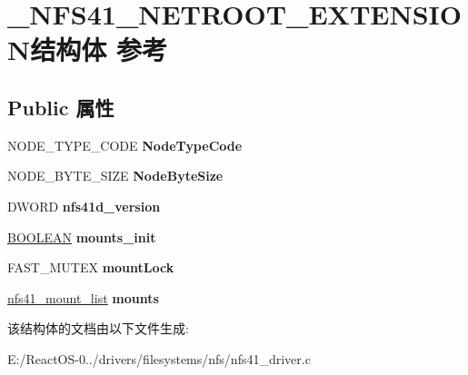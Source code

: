 \hypertarget{struct___n_f_s41___n_e_t_r_o_o_t___e_x_t_e_n_s_i_o_n}{}\section{\+\_\+\+N\+F\+S41\+\_\+\+N\+E\+T\+R\+O\+O\+T\+\_\+\+E\+X\+T\+E\+N\+S\+I\+O\+N结构体 参考}
\label{struct___n_f_s41___n_e_t_r_o_o_t___e_x_t_e_n_s_i_o_n}
\subsection*{Public 属性}
\begin{DoxyCompactItemize}
\item 
\mbox{\label{struct___n_f_s41___n_e_t_r_o_o_t___e_x_t_e_n_s_i_o_n_aedc8602747b987dd77724fafc4ced9c5}} 
N\+O\+D\+E\+\_\+\+T\+Y\+P\+E\+\_\+\+C\+O\+DE {\bfseries Node\+Type\+Code}
\item 
\mbox{\label{struct___n_f_s41___n_e_t_r_o_o_t___e_x_t_e_n_s_i_o_n_a5f8a9306eee11015306720f79f407eb6}} 
N\+O\+D\+E\+\_\+\+B\+Y\+T\+E\+\_\+\+S\+I\+ZE {\bfseries Node\+Byte\+Size}
\item 
\mbox{\label{struct___n_f_s41___n_e_t_r_o_o_t___e_x_t_e_n_s_i_o_n_a34e9e3fd32e45bdb32dd121f71abb9e8}} 
D\+W\+O\+RD {\bfseries nfs41d\+\_\+version}
\item 
\mbox{\label{struct___n_f_s41___n_e_t_r_o_o_t___e_x_t_e_n_s_i_o_n_af01ff4e721acf2ea9d7417a7e3f3e5dd}} 
\hyperlink{_processor_bind_8h_a112e3146cb38b6ee95e64d85842e380a}{B\+O\+O\+L\+E\+AN} {\bfseries mounts\+\_\+init}
\item 
\mbox{\label{struct___n_f_s41___n_e_t_r_o_o_t___e_x_t_e_n_s_i_o_n_acf5b5c4618de537cd813a78de6811144}} 
F\+A\+S\+T\+\_\+\+M\+U\+T\+EX {\bfseries mount\+Lock}
\item 
\mbox{\label{struct___n_f_s41___n_e_t_r_o_o_t___e_x_t_e_n_s_i_o_n_a4761727a717b091754c45d5ea3f8af64}} 
\hyperlink{struct__nfs41__mount__list}{nfs41\+\_\+mount\+\_\+list} {\bfseries mounts}
\end{DoxyCompactItemize}


该结构体的文档由以下文件生成\+:\begin{DoxyCompactItemize}
\item 
E\+:/\+React\+O\+S-\/0../drivers/filesystems/nfs/nfs41\+\_\+driver.\+c\end{DoxyCompactItemize}
